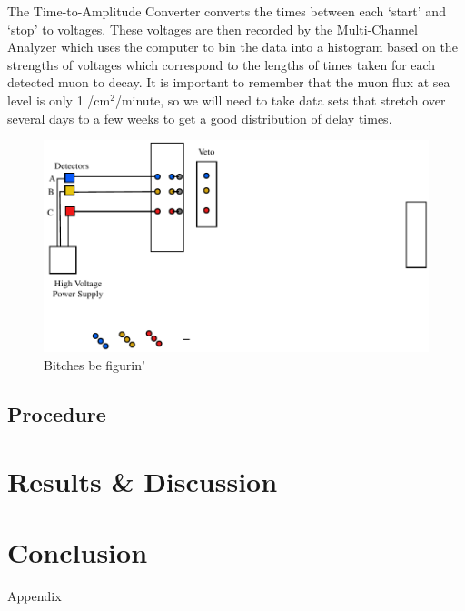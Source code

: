 \newline \indent The Time-to-Amplitude Converter converts the times between each `start' and `stop'  to voltages. These voltages are then recorded by the Multi-Channel Analyzer which uses the computer to bin the data into a histogram based on the strengths of voltages which correspond to the lengths of times taken for each detected muon to decay. It is important to remember that the muon flux at sea level is only 1 /cm$^2$/minute, so we will need to take data sets that stretch over several days to a few weeks to get a good distribution of delay times. 
\newline \indent 
\begin{figure}[H]
\begin{center}
\includegraphics[width=4 in]{ML-figure1.pdf}
\caption{Bitches be figurin'}
\end{center}
\end{figure}

\subsection{Procedure}


\section{Results \& Discussion}

\section{Conclusion}

\begin{thebibliography}{99}
\end{thebibliography}

\newpage \LARGE{Appendix}

  
